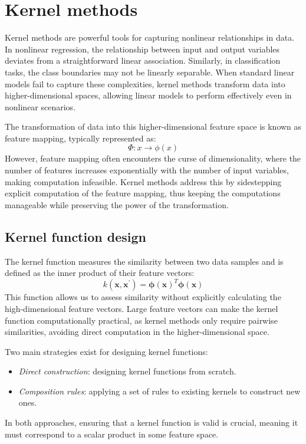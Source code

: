 \section{Kernel methods}

Kernel methods are powerful tools for capturing nonlinear relationships in data. 
In nonlinear regression, the relationship between input and output variables deviates from a straightforward linear association. 
Similarly, in classification tasks, the class boundaries may not be linearly separable. 
When standard linear models fail to capture these complexities, kernel methods transform data into higher-dimensional spaces, allowing linear models to perform effectively even in nonlinear scenarios.

The transformation of data into this higher-dimensional feature space is known as feature mapping, typically represented as:
\[\Phi:x\rightarrow\phi(x)\]
However, feature mapping often encounters the curse of dimensionality, where the number of features increases exponentially with the number of input variables, making computation infeasible.
Kernel methods address this by sidestepping explicit computation of the feature mapping, thus keeping the computations manageable while preserving the power of the transformation.

\subsection{Kernel function design}
The kernel function measures the similarity between two data samples and is defined as the inner product of their feature vectors:
\[k(\mathbf{x},\mathbf{x}^\prime)=\boldsymbol{\phi}{(\mathbf{x})}^T\boldsymbol{\phi}(\mathbf{x})\]
This function allows us to assess similarity without explicitly calculating the high-dimensional feature vectors. 
Large feature vectors can make the kernel function computationally practical, as kernel methods only require pairwise similarities, avoiding direct computation in the higher-dimensional space.

Two main strategies exist for designing kernel functions:
\begin{itemize}
    \item \textit{Direct construction}: designing kernel functions from scratch.
    \item \textit{Composition rules}: applying a set of rules to existing kernels to construct new ones.
\end{itemize}
In both approaches, ensuring that a kernel function is valid is crucial, meaning it must correspond to a scalar product in some feature space.

